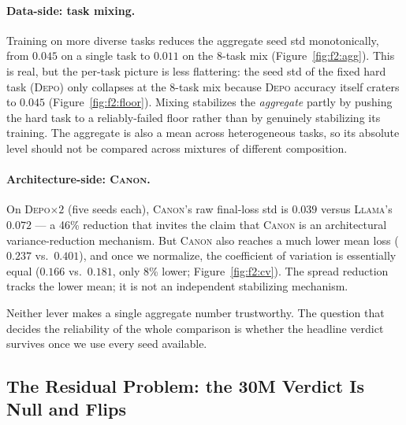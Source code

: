 \documentclass{article}
\newcommand{\Canon}{\textsc{Canon}\xspace}
\newcommand{\Depo}{\textsc{Depo}\xspace}
\newcommand{\Llama}{\textsc{Llama}\xspace}
\begin{document}
\paragraph{Data-side: task mixing.} Training on more diverse tasks reduces the aggregate seed
std monotonically, from $0.045$ on a single task to $0.011$ on the 8-task mix
(Figure~\ref{fig:f2:agg}). This is real, but the per-task picture is less flattering: the
seed std of the fixed hard task (\Depo) only collapses at the 8-task mix because \Depo
accuracy itself craters to $0.045$ (Figure~\ref{fig:f2:floor}). Mixing stabilizes the
\emph{aggregate} partly by pushing the hard task to a reliably-failed floor rather than by
genuinely stabilizing its training. The aggregate is also a mean across heterogeneous tasks,
so its absolute level should not be compared across mixtures of different composition.

\paragraph{Architecture-side: \Canon.} On \Depo$\times2$ (five seeds each), \Canon's raw final-loss
std is $0.039$ versus \Llama's $0.072$ --- a 46\% reduction that invites the claim that \Canon
is an architectural variance-reduction mechanism. But \Canon also reaches a much lower mean loss
($0.237$ vs.\ $0.401$), and once we normalize, the coefficient of variation is essentially equal
($0.166$ vs.\ $0.181$, only 8\% lower; Figure~\ref{fig:f2:cv}). The spread reduction tracks the
lower mean; it is not an independent stabilizing mechanism.

Neither lever makes a single aggregate number trustworthy. The question that decides the
reliability of the whole comparison is whether the headline verdict survives once we use every
seed available.

\subsection{The Residual Problem: the 30M Verdict Is Null and Flips}
\label{sec:p1:flip}
\end{document}
